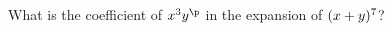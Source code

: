 
%
%
%
%      
% 
% 
%   



\SUBTRACT\vbone\vbtwo\p

\question What is the coefficient of $x^{\vbtwo} y^{\p}$ in the expansion of $(x + y)^{7}$?

\insertQR{}

\watchout

